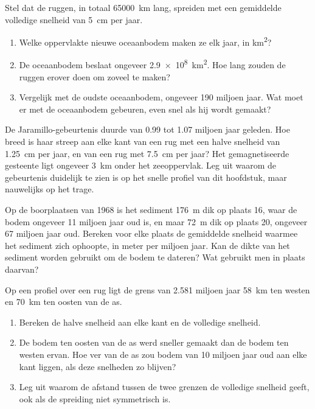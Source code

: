 \begin{exercise}[$\star\star\star$]\label{exo:g11:drift-to-spreading:12}
Stel dat de ruggen, in totaal \qty{65000}{km} lang, spreiden met een gemiddelde
volledige snelheid van \qty{5}{cm} per jaar.
\begin{enumerate}
  \item Welke oppervlakte nieuwe oceaanbodem maken ze elk jaar, in \unit{km^2}?
  \item De oceaanbodem beslaat ongeveer \qty{2.9e8}{km^2}. Hoe lang zouden de
        ruggen erover doen om zoveel te maken?
  \item Vergelijk met de oudste oceaanbodem, ongeveer \num{190} miljoen jaar.
        Wat moet er met de oceaanbodem gebeuren, even snel als hij wordt gemaakt?
\end{enumerate}
\end{exercise}

\begin{exercise}[$\star\star\star$]\label{exo:g11:drift-to-spreading:13}
De Jaramillo-gebeurtenis duurde van \num{0.99} tot \num{1.07} miljoen jaar geleden.
Hoe breed is haar streep aan elke kant van een rug met een halve snelheid van
\qty{1.25}{cm} per jaar, en van een rug met \qty{7.5}{cm} per jaar? Het
gemagnetiseerde gesteente ligt ongeveer \qty{3}{km} onder het zeeoppervlak. Leg
uit waarom de gebeurtenis duidelijk te zien is op het snelle profiel van dit
hoofdstuk, maar nauwelijks op het trage.
\end{exercise}

\begin{exercise}[$\star\star\star$]\label{exo:g11:drift-to-spreading:14}
Op de boorplaatsen van 1968 is het sediment \qty{176}{m} dik op plaats 16, waar de
bodem ongeveer \num{11} miljoen jaar oud is, en maar \qty{72}{m} dik op plaats 20,
ongeveer \num{67} miljoen jaar oud. Bereken voor elke plaats de gemiddelde snelheid
waarmee het sediment zich ophoopte, in meter per miljoen jaar. Kan de dikte van
het sediment worden gebruikt om de bodem te dateren? Wat gebruikt men in plaats
daarvan?
\end{exercise}

\begin{exercise}[$\star\star\star$]\label{exo:g11:drift-to-spreading:15}
Op een profiel over een rug ligt de grens van \num{2.581} miljoen jaar
\qty{58}{km} ten westen en \qty{70}{km} ten oosten van de as.
\begin{enumerate}
  \item Bereken de halve snelheid aan elke kant en de volledige snelheid.
  \item De bodem ten oosten van de as werd sneller gemaakt dan de bodem ten
        westen ervan. Hoe ver van de as zou bodem van 10 miljoen jaar oud aan
        elke kant liggen, als deze snelheden zo blijven?
  \item Leg uit waarom de afstand tussen de twee grenzen de volledige snelheid
        geeft, ook als de spreiding niet symmetrisch is.
\end{enumerate}
\end{exercise}

